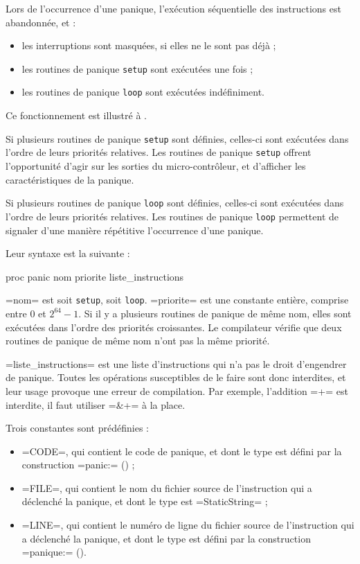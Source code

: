 Lors de l'occurrence d'une panique, l'exécution séquentielle des instructions est abandonnée, et :
\begin{itemize}
  \item les interruptions sont masquées, si elles ne le sont pas déjà ;
  \item les routines de panique \texttt{setup} sont exécutées une fois ;
  \item les routines de panique \texttt{loop} sont exécutées indéfiniment.
\end{itemize}
Ce fonctionnement est illustré à .

Si plusieurs routines de panique \texttt{setup} sont définies, celles-ci sont exécutées dans l'ordre de leurs priorités relatives. Les routines de panique \texttt{setup} offrent l'opportunité d'agir sur les sorties du micro-contrôleur, et d'afficher les caractéristiques de la panique.

Si plusieurs routines de panique \texttt{loop} sont définies, celles-ci sont exécutées dans l'ordre de leurs priorités relatives. Les routines de panique \texttt{loop} permettent de signaler d'une manière répétitive l'occurrence d'une panique.


Leur syntaxe est la suivante :
\begin{PLM}
proc panic nom priorite {
  liste_instructions
}
\end{PLM}

\plm=nom= est soit \texttt{setup}, soit \texttt{loop}. \plm=priorite= est une constante entière, comprise entre $0$ et $2^{64}-1$. Si il y a plusieurs routines de panique de même nom, elles sont exécutées dans l'ordre des priorités croissantes. Le compilateur vérifie que deux routines de panique de même nom n'ont pas la même priorité.

\plm=liste_instructions= est une liste d'instructions qui n'a pas le droit d'engendrer de panique. Toutes les opérations susceptibles de le faire sont donc interdites, et leur usage provoque une erreur de compilation. Par exemple, l'addition \plm=+= est interdite, il faut utiliser \plm=&+= à la place.

Trois constantes sont prédéfinies :
\begin{itemize}
  \item \plm=CODE=, qui contient le code de panique, et dont le type est défini par la construction \plm=panic:= () ;
  \item \plm=FILE=, qui contient le nom du fichier source de l'instruction qui a déclenché la panique, et dont le type est \plm=StaticString= ;
  \item \plm=LINE=, qui contient le numéro de ligne du fichier source de l'instruction qui a déclenché la panique, et dont le type est défini par la construction \plm=panique:= ().
\end{itemize}

